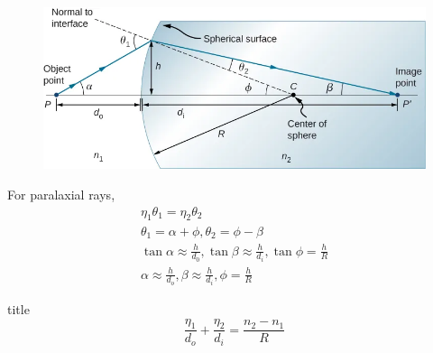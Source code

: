 \documentclass{beamer}
\begin{document}
\begin{frame}
	\begin{figure}[htbp] 
		\hspace*{-2cm}                                                            
		   \includegraphics[scale=0.35]{54.png}%
		  \label{fig:Prob1:MEA} 
		\end{figure}
		For paralaxial rays,
		\begin{align*}
		\eta_{1} \theta_{1} = \eta_{2} \theta_{2} \\
		\theta_{1} = \alpha + \phi,\theta_{2} = \phi - \beta \\
		\tan \alpha \approx \frac{h}{d_{0}}, \tan \beta \approx \frac{h}{d_{i}}, \tan \phi = \frac{h}{R} \\
		\alpha \approx \frac{h}{d_{o}},  \beta \approx \frac{h}{d_{i}}, \phi = \frac{h}{R}
		\end{align*}

\end{frame}
\begin{frame}{}
	\begin{block}{title}
		\begin{displaymath}
			\frac{\eta_{1}}{d_{o}} + \frac{\eta_{2}}{d_{i}} = \frac{n_{2} - n_{1}}{R}
		\end{displaymath}
	\end{block}
\end{frame}
\end{document}

